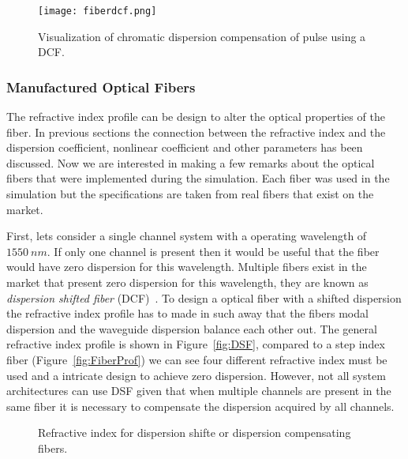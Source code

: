 \begin{figure}[h]
\center
\texttt{[image: fiberdcf.png]}
\caption{Visualization of chromatic dispersion compensation of pulse using a DCF.  }
\label{fig:GVD}
\end{figure} 
\subsubsection{Manufactured Optical Fibers}\label{sec:ManOpF}

The refractive index profile can be design to alter the optical properties of the fiber. In previous sections the connection between the refractive index and the dispersion coefficient, nonlinear coefficient and other parameters has been discussed. Now we are interested in making a few remarks about the optical fibers that were implemented during the simulation. Each fiber was used in the simulation but the specifications are taken from real fibers that exist on the market.

First, lets consider a single channel system with a operating wavelength of $1550~nm$. If only one channel is present then it would be useful that the fiber would have zero dispersion for this wavelength. Multiple fibers exist in the market that present zero dispersion for this wavelength, they are known as  \textit{dispersion shifted fiber} (DCF)~\cite{kato2000dispersion,kim1994measurement}. To design a optical fiber with a shifted dispersion the refractive index profile has to made in such away that the fibers modal dispersion and the waveguide dispersion balance each other out. The general refractive index profile is shown in Figure~\ref{fig:DSF}, compared to a step index fiber (Figure~\ref{fig:FiberProf}) we can see four different refractive index must be used and a intricate  design to achieve zero dispersion. However, not all system architectures can use DSF given that when multiple channels are present in the same fiber it is necessary to compensate the dispersion acquired by all channels.


\begin{figure}[H]
  \centering
  \qquad
  \caption{Refractive index for dispersion shifte or dispersion compensating fibers.}
  \label{fig:FiberIndex}
\end{figure}



